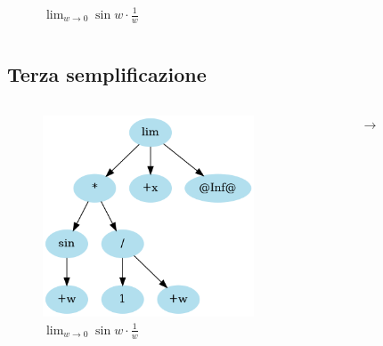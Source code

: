 \documentclass[aspectratio=149]{beamer}
\begin{document}
\begin{frame}
\begin{columns}
\begin{column}{0.45\textwidth}
\begin{figure}
					\caption{\(\lim_{w \to 0}{\sin{w} \cdot \frac{1}{w}}\)}
				\end{figure}
			\end{column}
		\end{columns}
	\end{frame}

	\subsection{Terza semplificazione}
	
	\begin{frame}
		\begin{columns}
			\begin{column}{0.45\textwidth}
				\begin{figure}
					\includegraphics[width=0.8\textwidth]{pres_img/rewritten.png}
					\caption{\(\lim_{w \to 0}{\sin{w} \cdot \frac{1}{w}}\)}
				\end{figure}
			\end{column}
			\begin{column}{0.1\textwidth}
				\begin{center}
					$\rightarrow$
				\end{center}
			\end{column}
			\begin{column}{0.45\textwidth}
				\begin{figure}

\end{figure}
\end{column}
\end{columns}
\end{frame}
\end{document}
